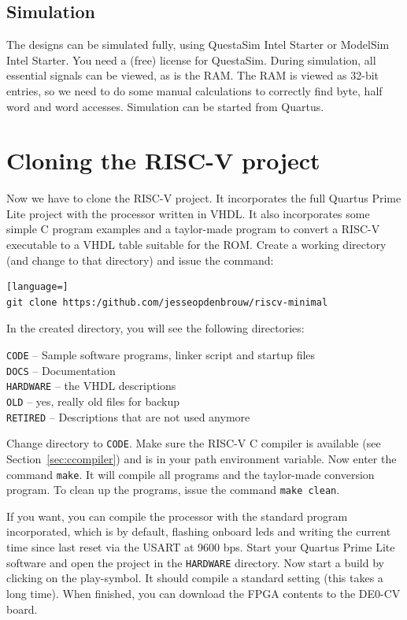 \documentclass[12pt]{article}
\begin{document}
\subsection{Simulation}
The designs can be simulated fully, using QuestaSim Intel Starter or ModelSim Intel Starter. You need a (free) license for QuestaSim. During simulation, all essential signals can be viewed, as is the RAM. The RAM is viewed as 32-bit entries, so we need to do some manual calculations to correctly find byte, half word and word accesses. Simulation can be started from Quartus.

\section{Cloning the RISC-V project}
\label{sec:cloning}
Now we have to clone the RISC-V project. It incorporates the full Quartus Prime Lite project with the processor written in VHDL. It also incorporates some simple C program examples and a taylor-made program to convert a RISC-V executable to a VHDL table suitable for the ROM. Create a working directory (and change to that directory) and issue the command:

\begin{lstlisting}[language=]
git clone https:/github.com/jesseopdenbrouw/riscv-minimal
\end{lstlisting}

In the created directory, you will see the following directories:

\texttt{CODE} -- Sample software programs, linker script and startup files\\
\texttt{DOCS} -- Documentation\\
\texttt{HARDWARE} -- the VHDL descriptions \\
\texttt{OLD} -- yes, really old files for backup\\
\texttt{RETIRED} -- Descriptions that are not used anymore

Change directory to \texttt{CODE}. Make sure the RISC-V C compiler is available (see Section~\ref{sec:ccompiler}) and is in your path environment variable. Now enter the command \texttt{make}. It will compile all programs and the taylor-made conversion program. To clean up the programs, issue the command \texttt{make clean}.

If you want, you can compile the processor with the standard program incorporated, which is by default, flashing onboard leds and writing the current time since last reset via the USART at 9600 bps. Start your Quartus Prime Lite software and open the project in the \texttt{HARDWARE} directory. Now start a build by clicking on the play-symbol. It should compile a standard setting (this takes a long time). When finished, you can download the FPGA contents to the DE0-CV board.
\end{document}
